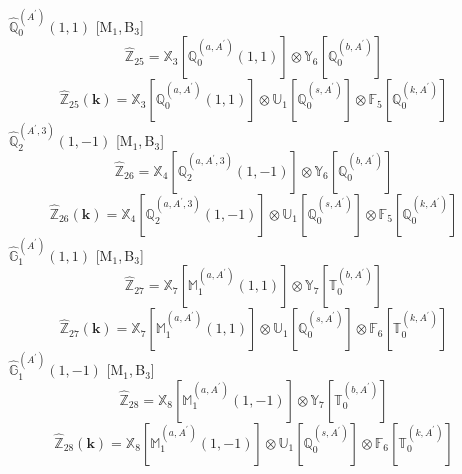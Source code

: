 \documentclass[fleqn,10pt,landscape]{article}
\begin{document}
\begin{itemize}
\begin{dmath*}
\end{dmath*}
\vspace{4mm}
\noindent {} $\,\,\,\hat{\mathbb{Q}}_{0}^{(A^{\prime})}(1,1)$ [M$_{1}$,\,B$_{3}$]
\begin{dmath*}
\hat{\mathbb{Z}}_{25}=\mathbb{X}_{3}[\mathbb{Q}_{0}^{(a,A^{\prime})}(1,1)] \otimes\mathbb{Y}_{6}[\mathbb{Q}_{0}^{(b,A^{\prime})}]
\end{dmath*}
\begin{dmath*}
\hat{\mathbb{Z}}_{25}(\bm{k})=\mathbb{X}_{3}[\mathbb{Q}_{0}^{(a,A^{\prime})}(1,1)] \otimes\mathbb{U}_{1}[\mathbb{Q}_{0}^{(s,A^{\prime})}] \otimes\mathbb{F}_{5}[\mathbb{Q}_{0}^{(k,A^{\prime})}]
\end{dmath*}
\vspace{4mm}
\noindent {} $\,\,\,\hat{\mathbb{Q}}_{2}^{(A^{\prime},3)}(1,-1)$ [M$_{1}$,\,B$_{3}$]
\begin{dmath*}
\hat{\mathbb{Z}}_{26}=\mathbb{X}_{4}[\mathbb{Q}_{2}^{(a,A^{\prime},3)}(1,-1)] \otimes\mathbb{Y}_{6}[\mathbb{Q}_{0}^{(b,A^{\prime})}]
\end{dmath*}
\begin{dmath*}
\hat{\mathbb{Z}}_{26}(\bm{k})=\mathbb{X}_{4}[\mathbb{Q}_{2}^{(a,A^{\prime},3)}(1,-1)] \otimes\mathbb{U}_{1}[\mathbb{Q}_{0}^{(s,A^{\prime})}] \otimes\mathbb{F}_{5}[\mathbb{Q}_{0}^{(k,A^{\prime})}]
\end{dmath*}
\vspace{4mm}
\noindent {} $\,\,\,\hat{\mathbb{G}}_{1}^{(A^{\prime})}(1,1)$ [M$_{1}$,\,B$_{3}$]
\begin{dmath*}
\hat{\mathbb{Z}}_{27}=\mathbb{X}_{7}[\mathbb{M}_{1}^{(a,A^{\prime})}(1,1)] \otimes\mathbb{Y}_{7}[\mathbb{T}_{0}^{(b,A^{\prime})}]
\end{dmath*}
\begin{dmath*}
\hat{\mathbb{Z}}_{27}(\bm{k})=\mathbb{X}_{7}[\mathbb{M}_{1}^{(a,A^{\prime})}(1,1)] \otimes\mathbb{U}_{1}[\mathbb{Q}_{0}^{(s,A^{\prime})}] \otimes\mathbb{F}_{6}[\mathbb{T}_{0}^{(k,A^{\prime})}]
\end{dmath*}
\vspace{4mm}
\noindent {} $\,\,\,\hat{\mathbb{G}}_{1}^{(A^{\prime})}(1,-1)$ [M$_{1}$,\,B$_{3}$]
\begin{dmath*}
\hat{\mathbb{Z}}_{28}=\mathbb{X}_{8}[\mathbb{M}_{1}^{(a,A^{\prime})}(1,-1)] \otimes\mathbb{Y}_{7}[\mathbb{T}_{0}^{(b,A^{\prime})}]
\end{dmath*}
\begin{dmath*}
\hat{\mathbb{Z}}_{28}(\bm{k})=\mathbb{X}_{8}[\mathbb{M}_{1}^{(a,A^{\prime})}(1,-1)] \otimes\mathbb{U}_{1}[\mathbb{Q}_{0}^{(s,A^{\prime})}] \otimes\mathbb{F}_{6}[\mathbb{T}_{0}^{(k,A^{\prime})}]

\end{dmath*}
\end{itemize}
\end{document}
